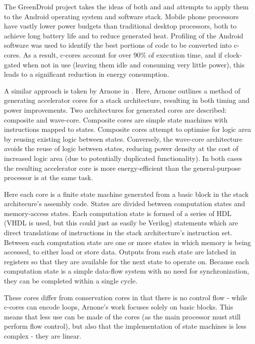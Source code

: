 \documentclass{UoYCSproject}
\begin{document}
The GreenDroid project \cite{greendroid} takes the ideas of both \cite{c-cores} and \cite{eco-cores} and attempts
to apply them to the Android operating system and software stack. Mobile phone processors have vastly lower power budgets than
traditional desktop processors, both to achieve long battery life and to reduce generated heat. Profiling of the Android
software was used to identify the best portions of code to be converted into c-cores. As a result,
c-cores account for over 90\% of execution time, and if clock-gated when not in use (leaving them idle and consuming
very little power), this leads to a significant reduction in energy consumption.

A similar approach is taken by Arnone in \cite{arnone-thesis}. Here, Arnone outlines a method of
generating accelerator cores for a stack architecture, resulting in both timing
and power improvements. Two architectures for generated cores are described: composite and wave-core.
Composite cores are simple state machines with instructions mapped to states. Composite cores attempt to
optimise for logic area by reusing existing logic between states. Conversely, the wave-core
architecture avoids the reuse of logic between states, reducing power density at the cost of increased
logic area (due to potentially duplicated functionality). In both cases the resulting accelerator core is
more energy-efficient than the general-purpose processor is at the same task.

Here each core is a finite state machine generated from a basic block in the stack architecure's
assembly code. States are divided between computation states and memory-access states. Each computation state
is formed of a series of HDL (VHDL is used, but this could just as easily be Verilog) statements which are direct
translations of instructions in the stack architecture's instruction set. Between each computation state are one
or more states in which memory is being accessed, to either load or store data. Outputs from each state are latched
in registers so that they are available for the next state to operate on. Because each computation state is a simple
data-flow system with no need for synchronization, they can be completed within a single cycle.

These cores differ from conservation cores in that there is no control flow - while c-cores can encode loops, Arnone's
work focuses solely on basic blocks. This means that less use can be made of the cores (as the main processor must still
perform flow control), but also that the implementation of state machines is less complex - they are linear.
\end{document}
